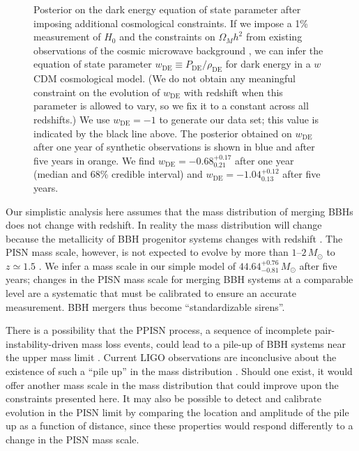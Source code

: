 \documentclass[modern]{aastex62}
\newcommand{\wDE}{w_\mathrm{DE}}
\newcommand{\MScaleFiveYear}{44.64^{+0.76}_{-0.81} \, \MSun{}}
\newcommand{\wDEOneYear}{-0.68^{+0.17}_{0.21}}
\newcommand{\wDEFiveYear}{-1.04^{+0.12}_{0.13}}
\newcommand{\MSun}{M_\odot}
\begin{document}
\begin{figure}
%
  \caption{\label{fig:wDE} Posterior on the dark energy equation of state
  parameter after imposing additional cosmological constraints.  If we impose a
  1\% measurement of $H_0$ \citep{Chen2017,Mortlock2018,2018PhRvD..98h3523D} and the constraints on
  $\Omega_M h^2$ from existing observations of the cosmic microwave background
  \citep{Planck2016}, we can infer the equation of state parameter $\wDE{}
  \equiv P_\mathrm{DE} / \rho_\mathrm{DE}$ for dark energy in a $w$CDM
  cosmological model.  (We do not obtain any meaningful constraint on the
  evolution of $\wDE{}$ with redshift when this parameter is allowed to vary, so
  we fix it to a constant across all redshifts.)  We use $\wDE{} = -1$ to
  generate our data set; this value is indicated by the black line above.  The
  posterior obtained on $\wDE{}$ after one year of synthetic observations is
  shown in blue and after five years in orange.  We find $\wDE{} =
  \wDEOneYear{}$ after one year (median and 68\% credible interval) and $\wDE{}
  = \wDEFiveYear{}$ after five years.}
%
\end{figure}

Our simplistic analysis here assumes that the mass distribution of merging
\acp{BBH} does not change with redshift.  In reality the mass distribution will
change because the metallicity of \ac{BBH} progenitor systems changes with
redshift \citep{Belczynski2016,Mapelli2017}.  The \ac{PISN} mass scale, however,
is not expected to evolve by more than $1$--$2\,\MSun{}$ to $z \simeq 1.5$
\citep{Belczynski2016,Mapelli2017}.  We infer a mass scale in our simple model
of $\MScaleFiveYear{}$ after five years; changes in the \ac{PISN} mass scale for
merging \ac{BBH} systems at a comparable level are a systematic that must be
calibrated to ensure an accurate measurement.  \ac{BBH} mergers thus become
``standardizable sirens''.

There is a possibility that the \ac{PPISN} process, a sequence of incomplete
pair-instability-driven mass loss events, could lead to a pile-up of \ac{BBH}
systems near the upper mass limit
\citep{Belczynski2016,Marchant2018,Talbot2018}.  Current LIGO observations are
inconclusive about the existence of such a ``pile up'' in the mass distribution
\citep{O1O2Population}.  Should one exist, it would offer another mass scale in
the mass distribution that could improve upon the constraints presented here. It
may also be possible to detect and calibrate evolution in the \ac{PISN} limit by
comparing the location and amplitude of the pile up as a function of distance,
since these properties would respond differently to a change in the \ac{PISN}
mass scale.
\end{document}
